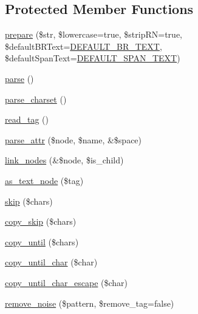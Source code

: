 \subsection*{Protected Member Functions}
\begin{DoxyCompactItemize}
\item 
\hyperlink{classsimple__html__dom_a5c2e8093a84d64af2fdcbd9116a297d1}{prepare} (\$str, \$lowercase=true, \$strip\+R\+N=true, \$default\+B\+R\+Text=\hyperlink{simple__html__dom_8php_a898bdf60fe4d05c1c50013eed5e2c6e8}{D\+E\+F\+A\+U\+L\+T\+\_\+\+B\+R\+\_\+\+T\+E\+X\+T}, \$default\+Span\+Text=\hyperlink{simple__html__dom_8php_a30d58d7d3a53efc61f064b53a434bafe}{D\+E\+F\+A\+U\+L\+T\+\_\+\+S\+P\+A\+N\+\_\+\+T\+E\+X\+T})
\item 
\hyperlink{classsimple__html__dom_a38d99acc70a1d8fd8f94455743b2d237}{parse} ()
\item 
\hyperlink{classsimple__html__dom_a519f20b58429f11fb3c3839efcc7f484}{parse\+\_\+charset} ()
\item 
\hyperlink{classsimple__html__dom_a11913c53d09e73dc367062ee54abde20}{read\+\_\+tag} ()
\item 
\hyperlink{classsimple__html__dom_a6d54ee34e0f121005da327b6fe0ab7e4}{parse\+\_\+attr} (\$node, \$name, \&\$space)
\item 
\hyperlink{classsimple__html__dom_a19edb141f64d5d085874f2e75e0aa333}{link\+\_\+nodes} (\&\$node, \$is\+\_\+child)
\item 
\hyperlink{classsimple__html__dom_a17ff0dd434a94d34972e3c90fbd0d545}{as\+\_\+text\+\_\+node} (\$tag)
\item 
\hyperlink{classsimple__html__dom_a83de9b35df2e0857f2b0be5bff3e4960}{skip} (\$chars)
\item 
\hyperlink{classsimple__html__dom_a48081dad72c2e828f05ae7420d95c820}{copy\+\_\+skip} (\$chars)
\item 
\hyperlink{classsimple__html__dom_a607299237161af9369abc2d2605715d5}{copy\+\_\+until} (\$chars)
\item 
\hyperlink{classsimple__html__dom_a0dcd73e05f3cee1eafe3ec6fa347c36b}{copy\+\_\+until\+\_\+char} (\$char)
\item 
\hyperlink{classsimple__html__dom_a2df9f8464f8daf439f9fa740ebdc0ede}{copy\+\_\+until\+\_\+char\+\_\+escape} (\$char)
\item 
\hyperlink{classsimple__html__dom_a5bf6f05cd9b47a87912de85a6a556b6b}{remove\+\_\+noise} (\$pattern, \$remove\+\_\+tag=false)
\end{DoxyCompactItemize}
